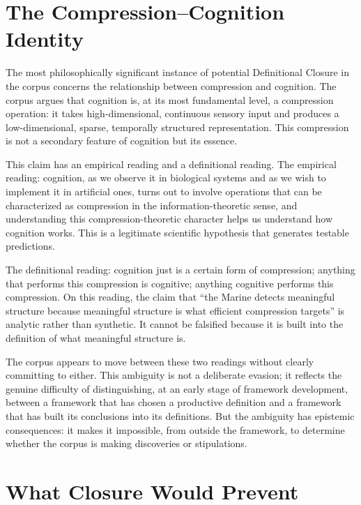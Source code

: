 \section{The Compression--Cognition Identity}
\label{sec:compression-cognition-identity}

The most philosophically significant instance of potential
Definitional Closure in the corpus concerns the relationship
between compression and cognition. The corpus argues that
cognition is, at its most fundamental level, a compression
operation: it takes high-dimensional, continuous sensory
input and produces a low-dimensional, sparse, temporally
structured representation. This compression is not a
secondary feature of cognition but its essence.

This claim has an empirical reading and a definitional reading.
The empirical reading: cognition, as we observe it in
biological systems and as we wish to implement it in
artificial ones, turns out to involve operations that
can be characterized as compression in the information-theoretic
sense, and understanding this compression-theoretic character
helps us understand how cognition works. This is a
legitimate scientific hypothesis that generates testable
predictions.

The definitional reading: cognition just is a certain form
of compression; anything that performs this compression
is cognitive; anything cognitive performs this compression.
On this reading, the claim that ``the Marine detects
meaningful structure because meaningful structure is
what efficient compression targets'' is analytic rather
than synthetic. It cannot be falsified because it is
built into the definition of what meaningful structure is.

The corpus appears to move between these two readings
without clearly committing to either. This ambiguity is
not a deliberate evasion; it reflects the genuine
difficulty of distinguishing, at an early stage of
framework development, between a framework that has chosen
a productive definition and a framework that has built its
conclusions into its definitions. But the ambiguity has
epistemic consequences: it makes it impossible, from
outside the framework, to determine whether the corpus
is making discoveries or stipulations.

\section{What Closure Would Prevent}
\label{sec:closure-prevents}


